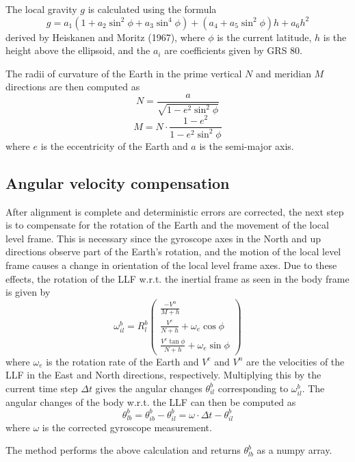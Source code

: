 \documentclass[11pt, oneside]{article}   	%
\begin{document}
The local gravity $g$ is calculated using the formula  $$g=a_1(1+a_2\sin^2\phi+a_3\sin^4\phi)+(a_4+a_5\sin^2\phi)h+a_6h^2$$ derived by Heiskanen and Moritz (1967), where $\phi$ is the current latitude, $h$ is the height above the ellipsoid, and the $a_i$ are coefficients given by GRS 80.

The radii of curvature of the Earth in the prime vertical $N$ and meridian $M$ directions are then computed as 
$$N=\frac{a}{\sqrt{1-e^2\sin^2\phi}}$$
$$M=N\cdot \frac{1-e^2}{1-e^2\sin^2\phi}$$
where $e$ is the eccentricity of the Earth and $a$ is the semi-major axis.

\subsection{Angular velocity compensation}

After alignment is complete and deterministic errors are corrected, the next step is to compensate for the rotation of the Earth and the movement of the local level frame.  This is necessary since the gyroscope axes in the North and up directions observe part of the Earth's rotation, and the motion of the local level frame causes a change in orientation of the local level frame axes.  Due to these effects, the rotation of the LLF w.r.t. the inertial frame as seen in the body frame is given by 
$$\omega_{il}^b=R_l^b\begin{pmatrix}
\frac{-V^n}{M+h} \\[.1cm]
\frac{V^e}{N+h}+\omega_e \cos\phi \\[.1cm]
\frac{V^e\tan\phi}{N+h}+\omega_e \sin\phi
\end{pmatrix}$$
where $\omega_e$ is the rotation rate of the Earth and $V^e$ and $V^n$ are the velocities of the LLF in the East and North directions, respectively.  Multiplying this by the current time step $\Delta t$ gives the angular changes $\theta_{il}^b$ corresponding to $\omega_{il}^b$.  The angular changes of the body w.r.t. the LLF can then be computed as $$\theta_{lb}^b=\theta_{ib}^b-\theta_{il}^b=\omega\cdot\Delta t-\theta_{il}^b$$ where $\omega$ is the corrected gyroscope measurement.

The  method performs the above calculation and returns $\theta_{lb}^b$ as a numpy array.
\end{document}

